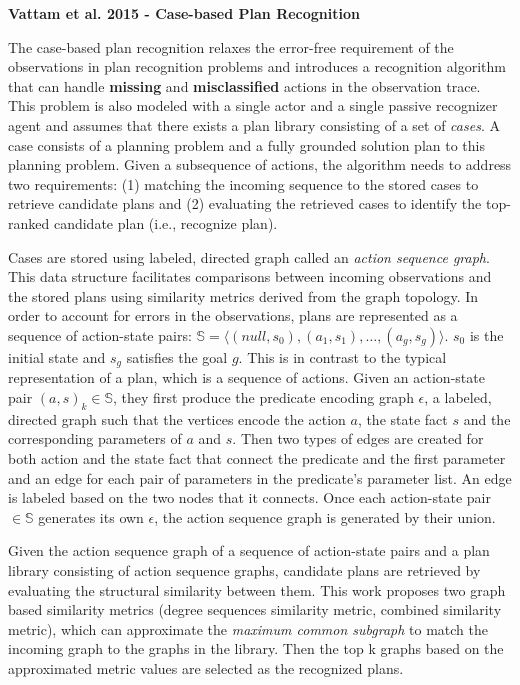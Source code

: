 \noindent\textbf{Vattam et al. 2015 - Case-based Plan Recognition}

The case-based plan recognition \cite{vattam2015case} relaxes the error-free requirement of the observations in plan recognition problems and introduces a recognition algorithm that can handle \textbf{missing} and \textbf{misclassified} actions in the observation trace. This problem is also modeled with a single actor and a single passive recognizer agent and assumes that there exists a plan library consisting of a set of \textit{cases}. A case consists of a planning problem and a fully grounded solution plan to this planning problem. Given a subsequence of actions, the algorithm needs to address two requirements: (1) matching the incoming sequence to the stored cases to retrieve candidate plans and (2) evaluating the retrieved cases to identify the top-ranked candidate plan (i.e., recognize plan).

Cases are stored using labeled, directed graph called an \textit{action sequence graph}. 
This data structure facilitates comparisons between incoming observations and the stored plans using similarity metrics derived from the graph topology. In order to account for errors in the observations, plans are represented as a sequence of action-state pairs: $\mathbb{S}=\langle (null,s_0), (a_1, s_1), \ldots, (a_g,s_g)\rangle$. $s_0$ is the initial state and $s_g$ satisfies the goal $g$. This is in contrast to the typical representation of a plan, which is a sequence of actions. Given an action-state pair $(a,s)_k \in \mathbb{S}$, they first produce the predicate encoding graph $\epsilon$, a labeled, directed graph such that the vertices encode the action $a$, the state fact $s$ and the corresponding parameters of $a$ and $s$. Then two types of edges are created for both action and the state fact that connect the predicate and the first parameter and an edge for each pair of parameters in the predicate's parameter list. An edge is labeled based on the two nodes that it connects. Once each action-state pair $\in \mathbb{S}$ generates its own $\epsilon$, the action sequence graph is generated by their union.

Given the action sequence graph of a sequence of action-state pairs and a plan library consisting of action sequence graphs, candidate plans are retrieved by evaluating the structural similarity between them. This work proposes two graph based similarity metrics (degree sequences similarity metric, combined similarity metric), which can approximate the \textit{maximum common subgraph} to match the incoming graph to the graphs in the library. Then the top k graphs based on the approximated metric values are selected as the recognized plans.

